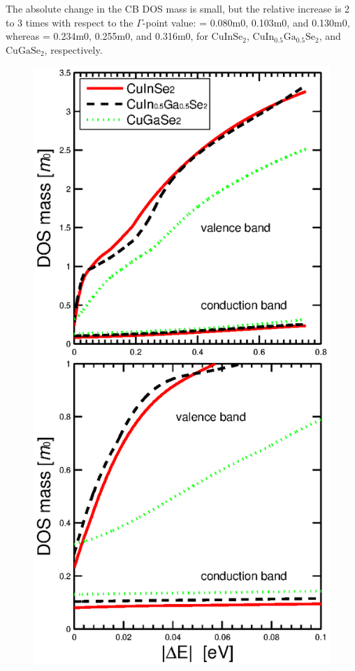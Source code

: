 \documentclass[a4paper, 12pt, titlepage,oneside,drop]{kthesis}
\begin{document}
The absolute change in the CB DOS mass is small, but the relative increase is 2 to 3 times with respect to the $\Gamma$-point value:  = 0.080m0, 0.103m0, and 0.130m0, 
whereas = 0.234m0, 0.255m0, and 0.316m0, for $\mathrm {CuInSe_2}$, $\mathrm {CuIn_{0.5}Ga_{0.5}Se_2}$, and $\mathrm {CuGaSe_2}$, respectively.

\begin{figure}[H]
\begin{center}
\includegraphics[scale=.6]{paper2figure6.eps}

\end{center}
\end{figure}
\end{document}
